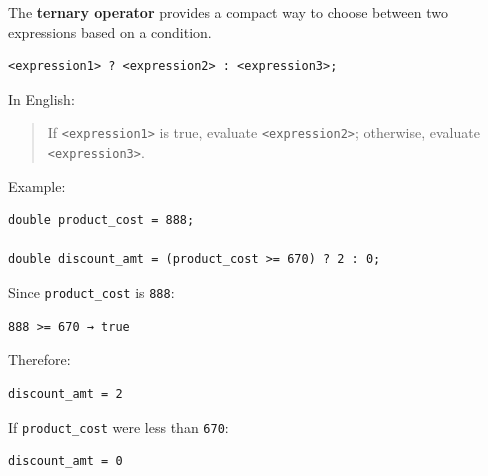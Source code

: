 \documentclass[11pt,a4paper]{article}
\begin{document}
\label{04-ternary-operators}
\hypertarget{04-ternary-operators}{}

The \textbf{ternary operator} provides a compact way to choose between two expressions based on a condition.

\begin{lstlisting}[style=cscode]
<expression1> ? <expression2> : <expression3>;
\end{lstlisting}

In English:

\begin{quote}
If \texttt{\textless{}expression1\textgreater{}} is true, evaluate \texttt{\textless{}expression2\textgreater{}}; otherwise, evaluate \texttt{\textless{}expression3\textgreater{}}.
\end{quote}

Example:

\begin{lstlisting}[style=cscode]
double product_cost = 888;

double discount_amt = (product_cost >= 670) ? 2 : 0;
\end{lstlisting}

Since \texttt{product\_cost} is \texttt{888}:

\begin{lstlisting}[style=plaincode]
888 >= 670 → true
\end{lstlisting}

Therefore:

\begin{lstlisting}[style=plaincode]
discount_amt = 2
\end{lstlisting}

If \texttt{product\_cost} were less than \texttt{670}:

\begin{lstlisting}[style=plaincode]
discount_amt = 0
\end{lstlisting}

\label{common-condition-tests}
\hypertarget{common-condition-tests}{}
\end{document}
